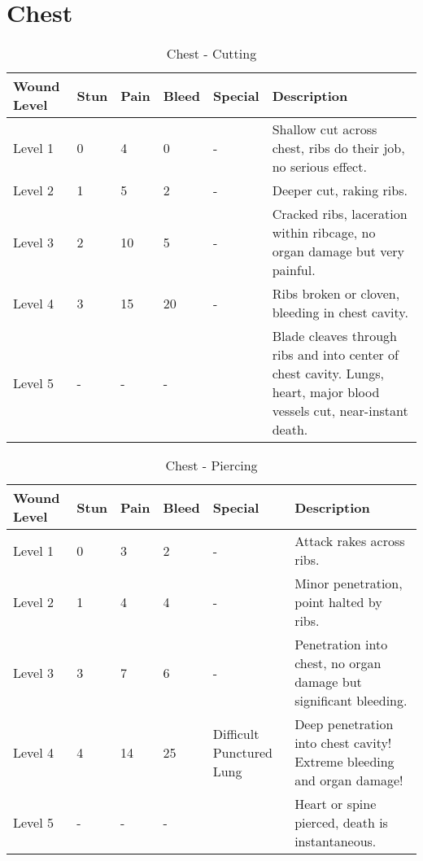\documentclass[oneside,11pt,english]{book}
\begin{document}
\section{Chest} \vspace{-25pt} \label{sec:chest}
\begin{table}[hb] %
	\caption{Chest - Cutting}
	\label{wound:Chest - Cutting}
	\begin{tabu} to 
Wound Level &Stun &Pain &Bleed &Special &Description\\\toprule
Level 1& 0& 4& 0& - &Shallow cut across chest, ribs do their job, no serious effect.\\
Level 2& 1& 5& 2& - &Deeper cut, raking ribs.\\
Level 3& 2& 10& 5& - &Cracked ribs, laceration within ribcage, no organ damage but very painful.\\
Level 4& 3& 15& 20& - &Ribs broken or cloven, bleeding in chest cavity.\\
Level 5& - &- &- && Blade cleaves through ribs and into center of chest cavity. Lungs, heart, major blood vessels cut, near-instant death.\\
	\end{tabu}
\end{table}

\begin{table}[hb] %
	\caption{Chest - Piercing}
	\label{wound:Chest - Piercing}
	\begin{tabu} to 
Wound Level &Stun &Pain &Bleed &Special &Description\\\toprule
Level 1& 0& 3& 2& - &Attack rakes across ribs.\\
Level 2& 1& 4& 4& - &Minor penetration, point halted by ribs.\\
Level 3& 3& 7& 6& - &Penetration into chest, no organ damage but significant bleeding.\\
Level 4& 4& 14& 25& Difficult~ Punctured Lung &Deep penetration into chest cavity! Extreme bleeding and organ damage!\\ %
Level 5& - &- &- && Heart or spine pierced, death is instantaneous.\\
	\end{tabu}
\end{table}
\end{document}
